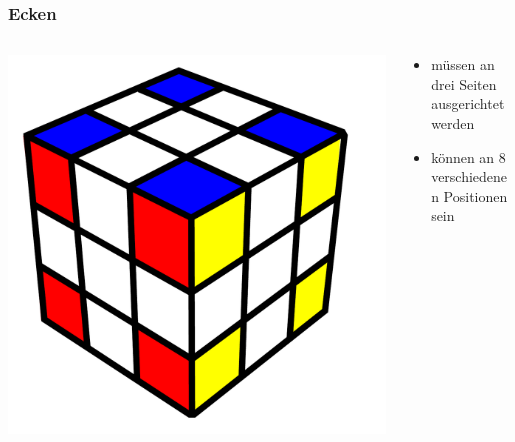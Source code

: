 \begin{frame}
	\frametitle{Ecken}
	
	\begin{columns}[c]
		\begin{column}[C]{.5\textwidth}
			\center
			\includegraphics[scale=0.3]{img/edges}
		\end{column}
		\begin{column}[C]{.5\textwidth}
			\begin{itemize}
				\item müssen an drei Seiten ausgerichtet werden
				\item können an 8 verschiedenen Positionen sein
			\end{itemize}
		\end{column}
	\end{columns}	
	
\end{frame}


